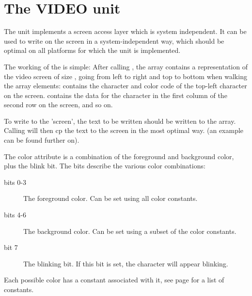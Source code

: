 %
%
%
%
%
%
\chapter{The VIDEO unit}

The  unit implements a screen access layer which is system
independent. It can be used to write on the screen in a system-independent
way, which should be optimal on all platforms for which the unit is
implemented.

The working of the  is simple: After calling ,
the array  contains a representation of the video screen of
size , going from left to right and top to
bottom when walking the array elements:  contains the 
character and color code of the top-left character on the screen.
 contains the data for the character in the
first column of the second row on the screen, and so on.

To write to the 'screen', the text to be written should be written to the
 array. Calling  will then cp the text to
the screen in the most optimal way. (an example can be found further on).

The color attribute is a combination of the foreground and background color,
plus the blink bit. The bits describe the various color combinations:
\begin{description}
\item[bits 0-3] The foreground color. Can be set using all color constants. 
\item[bits 4-6] The background color. Can be set using a subset of the
color constants.
\item[bit 7] The blinking bit. If this bit is set, the character will appear
blinking.
\end{description}
Each possible color has a constant associated with it, see page
\pageref{vidcolorconst} for a list of constants.

